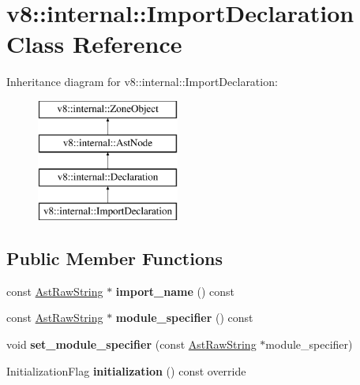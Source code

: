 \hypertarget{classv8_1_1internal_1_1_import_declaration}{}\section{v8\+:\+:internal\+:\+:Import\+Declaration Class Reference}
\label{classv8_1_1internal_1_1_import_declaration}
Inheritance diagram for v8\+:\+:internal\+:\+:Import\+Declaration\+:\begin{figure}[H]
\begin{center}
\leavevmode
\includegraphics[height=4.000000cm]{classv8_1_1internal_1_1_import_declaration}
\end{center}
\end{figure}
\subsection*{Public Member Functions}
\begin{DoxyCompactItemize}
\item 
const \hyperlink{classv8_1_1internal_1_1_ast_raw_string}{Ast\+Raw\+String} $\ast$ {\bfseries import\+\_\+name} () const \hypertarget{classv8_1_1internal_1_1_import_declaration_a789869a580dcd42aa20f4fe34abdfe6f}{}\label{classv8_1_1internal_1_1_import_declaration_a789869a580dcd42aa20f4fe34abdfe6f}

\item 
const \hyperlink{classv8_1_1internal_1_1_ast_raw_string}{Ast\+Raw\+String} $\ast$ {\bfseries module\+\_\+specifier} () const \hypertarget{classv8_1_1internal_1_1_import_declaration_ad7cf5dec3bab5a0ba63e9c4892c7102a}{}\label{classv8_1_1internal_1_1_import_declaration_ad7cf5dec3bab5a0ba63e9c4892c7102a}

\item 
void {\bfseries set\+\_\+module\+\_\+specifier} (const \hyperlink{classv8_1_1internal_1_1_ast_raw_string}{Ast\+Raw\+String} $\ast$module\+\_\+specifier)\hypertarget{classv8_1_1internal_1_1_import_declaration_a33943f398e3322eeaaf512f117f24429}{}\label{classv8_1_1internal_1_1_import_declaration_a33943f398e3322eeaaf512f117f24429}

\item 
Initialization\+Flag {\bfseries initialization} () const  override\hypertarget{classv8_1_1internal_1_1_import_declaration_a489144eefcdb5f7715268df8be96005e}{}\label{classv8_1_1internal_1_1_import_declaration_a489144eefcdb5f7715268df8be96005e}

\end{DoxyCompactItemize}
